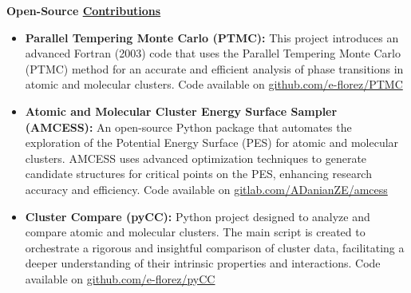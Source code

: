 {\bf\Large Open-Source \href{.}{Contributions}}

\begin{itemize}
    \small
    \item \textbf{Parallel Tempering Monte Carlo (PTMC):}
          This project introduces an advanced Fortran (2003) code that uses the Parallel Tempering Monte Carlo (PTMC) method for an accurate and efficient analysis of phase transitions in atomic and molecular clusters. Code available on \href{https://github.com/e-florez/PTMC}{github.com/e-florez/PTMC}

    \item \textbf{Atomic and Molecular Cluster Energy Surface Sampler (AMCESS):}
          An open-source Python package that automates the exploration of the Potential Energy Surface (PES) for atomic and molecular clusters. AMCESS uses advanced optimization techniques to generate candidate structures for critical points on the PES, enhancing research accuracy and efficiency. Code available on \href{https://gitlab.com/ADanianZE/amcess}{gitlab.com/ADanianZE/amcess}

    \item \textbf{Cluster Compare (pyCC):}
          Python project designed to analyze and compare atomic and molecular clusters. The main script is created to orchestrate a rigorous and insightful comparison of cluster data, facilitating a deeper understanding of their intrinsic properties and interactions. Code available on \href{https://github.com/e-florez/pyCC}{github.com/e-florez/pyCC}

\end{itemize}